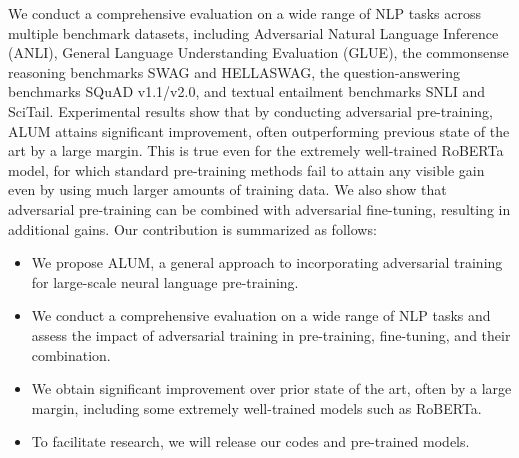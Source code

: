 \documentclass[11pt,a4paper]{article}
\newcommand\DNAME{ALUM}
\begin{document}
{We conduct a comprehensive evaluation on a wide range of NLP tasks across multiple benchmark datasets, including Adversarial Natural Language Inference (ANLI), 
General Language Understanding Evaluation (GLUE), 
the commonsense reasoning benchmarks SWAG and HELLASWAG, the question-answering benchmarks SQuAD v1.1/v2.0, and 
textual entailment benchmarks SNLI and SciTail. 
Experimental results show that by conducting adversarial pre-training, {\DNAME} attains significant improvement, often outperforming previous state of the art by a large margin.
This is true even for the extremely well-trained RoBERTa model, for which standard pre-training methods fail to attain any visible gain even by using much larger amounts of training data.
We also show that adversarial pre-training can be combined with adversarial fine-tuning, resulting in additional gains. 
Our contribution is summarized as follows:
\begin{itemize}
    \item We propose {\DNAME}, a general approach to incorporating adversarial training for large-scale neural language pre-training. \vspace{-4mm}
    \item We conduct a comprehensive evaluation on a wide range of NLP tasks and assess the impact of adversarial training in pre-training, fine-tuning, and their combination.\vspace{-4mm}
    \item We obtain significant improvement over prior state of the art, often by a large margin, including some extremely well-trained models such as RoBERTa.\vspace{-4mm}
    \item To facilitate research, we will release our codes and pre-trained models.\vspace{-4mm}
\end{itemize}
}
\end{document}
